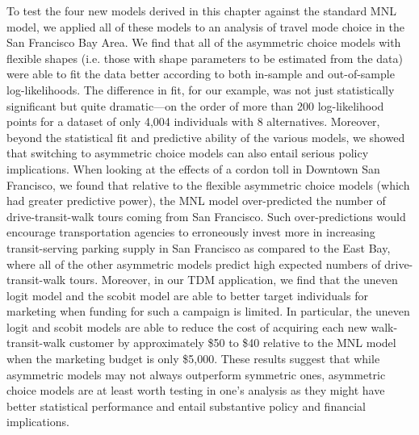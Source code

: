 To test the four new models derived in this chapter against the standard MNL model, we applied all of these models to an analysis of travel mode choice in the San Francisco Bay Area. We find that all of the asymmetric choice models with flexible shapes (i.e. those with shape parameters to be estimated from the data) were able to fit the data better according to both in-sample and out-of-sample log-likelihoods. The difference in fit, for our example, was not just statistically significant but quite dramatic---on the order of more than 200 log-likelihood points for a dataset of only 4,004 individuals with 8 alternatives. Moreover, beyond the statistical fit and predictive ability of the various models, we showed that switching to asymmetric choice models can also entail serious policy implications. When looking at the effects of a cordon toll in Downtown San Francisco, we found that relative to the flexible asymmetric choice models (which had greater predictive power), the MNL model over-predicted the number of drive-transit-walk tours coming from San Francisco. Such over-predictions would encourage transportation agencies to erroneously invest more in increasing transit-serving parking supply in San Francisco as compared to the East Bay, where all of the other asymmetric models predict high expected numbers of drive-transit-walk tours. Moreover, in our TDM application, we find that the uneven logit model and the scobit model are able to better target individuals for marketing when funding for such a campaign is limited. In particular, the uneven logit and scobit models are able to reduce the cost of acquiring each new walk-transit-walk customer by approximately \$50 to \$40 relative to the MNL model when the marketing budget is only \$5,000. These results suggest that while asymmetric models may not always outperform symmetric ones, asymmetric choice models are at least worth testing in one's analysis as they might have better statistical performance and entail substantive policy and financial implications.

